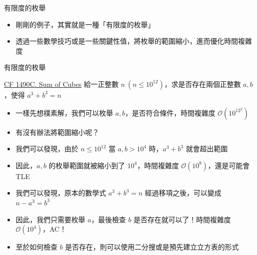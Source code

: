\documentclass[aspectratio=169]{beamer}
\begin{document}
    \begin{frame}{有限度的枚舉}
        \begin{itemize}
            \item 剛剛的例子，其實就是一種「有限度的枚舉」
            \item 透過一些數學技巧或是一些關鍵性值，將枚舉的範圍縮小，進而優化時間複雜度
        \end{itemize}
    \end{frame}


    \begin{frame}{有限度的枚舉}
        \begin{block}{\href{https://codeforces.com/problemset/problem/1490/C}{CF 1490C. Sum of Cubes}}
            給一正整數 $n\ (n \le 10^{12})$，求是否存在兩個正整數 $a, b$，使得 $a^3 + b^3 = n$
        \end{block}

        \begin{itemize}
            \item<1-> 一樣先想樸素解，我們可以枚舉 $a, b$，是否符合條件，時間複雜度 $\mathcal{O}(10^{12^2})$
            \item<2-> 有沒有辦法將範圍縮小呢？
            \item<3-> 我們可以發現，由於 $n \le 10^{12}$ 當 $a, b > 10^4$ 時，$a^3 + b^3$ 就會超出範圍
            \item<3-> 因此，$a, b$ 的枚舉範圍就被縮小到了 $10^4$，時間複雜度 $\mathcal{O}(10^8)$，還是可能會 TLE
            \item<4-> 我們可以發現，原本的數學式 $a^3 + b^3 = n$ 經過移項之後，可以變成 $n - a^3 = b^3$
            \item<4-> 因此，我們只需要枚舉 $a$，最後檢查 $b$ 是否存在就可以了！時間複雜度 $\mathcal{O}(10^4)$，AC！
            \item<4-> 至於如何檢查 $b$ 是否存在，則可以使用二分搜或是預先建立立方表的形式
        \end{itemize}
    \end{frame}
\end{document}
